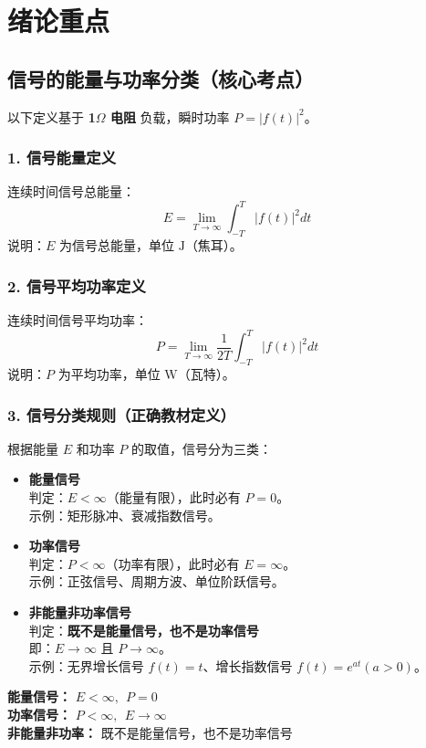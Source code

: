 \chapter{绪论重点}

\section{信号的能量与功率分类（核心考点）}

\noindent 以下定义基于 \textbf{1$\Omega$ 电阻} 负载，瞬时功率 $P = |f(t)|^2$。

\subsection{1. 信号能量定义}
连续时间信号总能量：
\[
E = \lim_{T \to \infty} \int_{-T}^{T} |f(t)|^2 dt
\]
说明：$E$ 为信号总能量，单位 $\mathrm{J}$（焦耳）。

\subsection{2. 信号平均功率定义}
连续时间信号平均功率：
\[
P = \lim_{T \to \infty} \frac{1}{2T} \int_{-T}^{T} |f(t)|^2 dt
\]
说明：$P$ 为平均功率，单位 $\mathrm{W}$（瓦特）。

\subsection{3. 信号分类规则（正确教材定义）}
根据能量 $E$ 和功率 $P$ 的取值，信号分为三类：
\begin{itemize}
    \item \textbf{能量信号} \\
    判定：$E < \infty$（能量有限），此时必有 $P = 0$。\\
    示例：矩形脉冲、衰减指数信号。
    
    \item \textbf{功率信号} \\
    判定：$P < \infty$（功率有限），此时必有 $E = \infty$。\\
    示例：正弦信号、周期方波、单位阶跃信号。
    
    \item \textbf{非能量非功率信号} \\
    判定：\textbf{既不是能量信号，也不是功率信号} \\
    即：$E \to \infty$ 且 $P \to \infty$。\\
    示例：无界增长信号 $f(t)=t$、增长指数信号 $f(t)=e^{at}(a>0)$。
\end{itemize}

\begin{tcolorbox}[colback=gray!5!white,colframe=black!70!blue,title=考试必背结论]
\textbf{能量信号：} $E<\infty,\ \ P=0$ \\
\textbf{功率信号：} $P<\infty,\ \ E\to\infty$ \\
\textbf{非能量非功率：} 既不是能量信号，也不是功率信号
\end{tcolorbox}